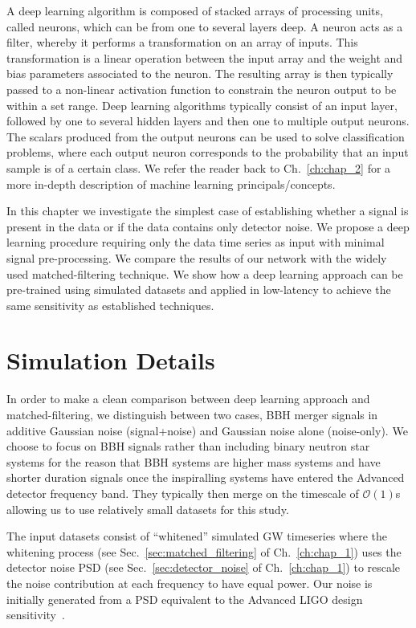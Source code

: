 %
%
A deep learning algorithm is composed of stacked arrays of processing units, called neurons, which can be from one to several layers deep. A neuron acts as a filter, whereby it performs a transformation on an array of inputs. This transformation is a linear operation between the input array and the weight and bias parameters associated to the neuron. The resulting array is then typically passed to a non-linear activation function to constrain the neuron output to be within a set range. Deep learning algorithms typically consist of an input layer, followed by one to several hidden layers and then one to multiple output neurons. The scalars produced from the output neurons can be used to solve classification problems, where each output neuron
corresponds to the probability that an input sample is of a certain
class. We refer the reader back to Ch.~\ref{ch:chap_2} for a more in-depth description 
of machine learning principals/concepts.

%
%
In this chapter we investigate the simplest case of establishing whether a signal is present in the data or if the data contains only detector noise. We propose a deep learning procedure requiring only the
data time series as input with minimal signal pre-processing. We compare the results of our network with the widely used matched-filtering technique. We show how a deep learning approach can be pre-trained using simulated datasets and applied in low-latency to achieve the same sensitivity as established techniques. 

%
\section{Simulation Details}
%
%
In order to make a clean comparison between deep learning approach and
matched-filtering, we distinguish between two cases, \ac{BBH} merger
signals in additive Gaussian noise (signal+noise) and Gaussian noise alone (noise-only). We choose to focus on \ac{BBH} signals rather than including binary neutron star systems for the reason that \ac{BBH} systems are higher mass systems and have shorter duration signals once the inspiralling systems have entered the Advanced detector frequency band. They typically then merge on the
timescale of $\mathcal{O}(1)$s allowing us to use relatively small datasets for this study. 

%
%
The input datasets consist of ``whitened'' simulated \ac{GW}
timeseries where the whitening process 
(see Sec.~\ref{sec:matched_filtering} of Ch.~\ref{ch:chap_1}) 
uses the detector noise \ac{PSD} (see Sec.~\ref{sec:detector_noise} 
of Ch.~\ref{ch:chap_1}) to rescale the noise contribution at 
each frequency to have equal power. Our noise is initially 
generated from a \ac{PSD} equivalent to the Advanced \ac{LIGO} 
design sensitivity~\cite{2016LRR....19....1A}. 

